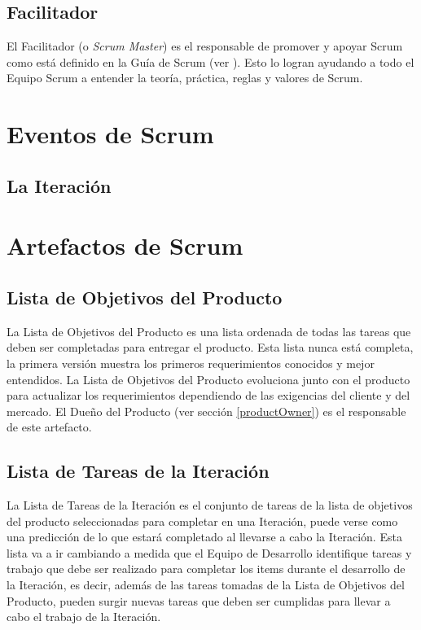 \subsection{Facilitador} \label{scrumMaster}
El Facilitador (o \emph{Scrum Master}) es el responsable de promover y apoyar Scrum como está definido en la Guía de Scrum (ver \cite{scrumSchwaber}). Esto lo logran ayudando a todo el Equipo Scrum a entender la teoría, práctica, reglas y valores de Scrum. \cite{scrumSchwaber}

\section{Eventos de Scrum}
\subsection{La Iteración} \label{sprint}


\section{Artefactos de Scrum}
\subsection{Lista de Objetivos del Producto} \label{productBacklog}
La Lista de Objetivos del Producto es una lista ordenada de todas las tareas que deben ser completadas para entregar el producto. Esta lista nunca está completa, la primera versión muestra los primeros requerimientos conocidos y mejor entendidos. \cite{scrumSchwaber} La Lista de Objetivos del Producto evoluciona junto con el producto para actualizar los requerimientos dependiendo de las exigencias del cliente y del mercado. El Dueño del Producto (ver sección \ref{productOwner}) es el responsable de este artefacto.

\subsection{Lista de Tareas de la Iteración}
La Lista de Tareas de la Iteración es el conjunto de tareas de la lista de objetivos del producto seleccionadas para completar en una Iteración, puede verse como una predicción de lo que estará completado al llevarse a cabo la Iteración. \cite{scrumSchwaber} Esta lista va a ir cambiando a medida que el Equipo de Desarrollo identifique tareas y trabajo que debe ser realizado para completar los items durante el desarrollo de la Iteración, es decir, además de las tareas tomadas de la Lista de Objetivos del Producto, pueden surgir nuevas tareas que deben ser cumplidas para llevar a cabo el trabajo de la Iteración.

